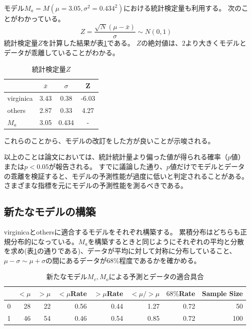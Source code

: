 モデル$M_a=M(\mu=3.05,\sigma^2=0.434^2)$における統計検定量も利用する。
次のことがわかっている。
\begin{equation*}
    Z = \frac{\sqrt{N}(\mu-\bar{x})}{\sigma} \sim N(0,1)
\end{equation*}
統計検定量$Z$を計算した結果が表\ref{table:speal_width_Z}である。
$Z$の絶対値は、$2$より大きくモデルとデータが乖離していることがわかる。

\begin{table}
    \caption{統計検定量$Z$}
    \label{table:speal_width_Z}
    \centering
    \begin{tabular}{lccc}
        \hline
        {} &   $\bar{x} $ &  $\sigma$  &     Z \\
        \hline \hline
        virginica &  3.43 &  0.38 & -6.03 \\
        others    &  2.87 &  0.33 &  4.27 \\
        $M_a$ & 3.05 & 0.434 & - \\
        \hline
    \end{tabular}
\end{table}

これらのことから、モデルの改訂をした方が良いことが示唆される。

以上のことは論文においては、統計統計量より偏った値が得られる確率（$p$値）または$p<0.05$が報告される。
すでに議論した通り、$p$値だけでモデルとデータの乖離を検証すると、モデルの予測性能が過度に低いと判定されることがある。さまざまな指標を元にモデルの予測性能を測るべきである。

\subsection{新たなモデルの構築}
virginicaとothersに適合するモデルをそれぞれ構築する。
累積分布はどちらも正規分布的になっている。$M_a$を構築するときと同じようにそれぞれの平均と分散を求め(表\ref{table:speal_width_Z}の通りである)、データが平均に対して対称に分布していること、$\mu-\sigma\sim\mu+\sigma$の間にあるデータが$68\%$程度であるかを確かめる。

\begin{table}
    \caption{新たなモデル$M_v,M_o$による予測とデータの適合具合}
    \label{table:speal_width_replace_model}
    \begin{tabular}{lrrrrrrr}
        \hline
        {} &  $<\mu$ &  $>\mu$ &  $<\mu$Rate &  $>\mu$Rate &  $<\mu/>\mu$  &  $68\%$Rate &  Sample Size \\
        \hline \hline
        0 &   28 &   22 &     0.56 &     0.44 &      1.27 &     0.72 &           50 \\
        1 &   46 &   54 &     0.46 &     0.54 &      0.85 &     0.72 &          100 \\
        \hline
    \end{tabular}
\end{table}   

